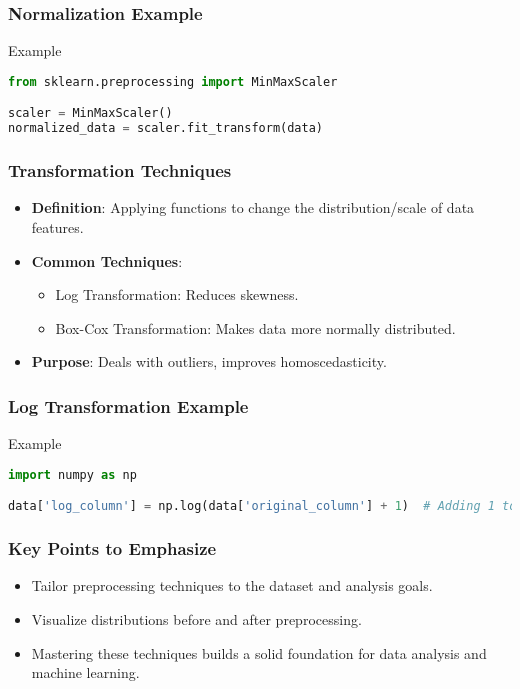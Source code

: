 \documentclass{beamer}
\begin{document}
\begin{frame}[fragile]
    \frametitle{Normalization Example}
    \begin{block}{Example}
    \begin{lstlisting}[language=Python]
from sklearn.preprocessing import MinMaxScaler

scaler = MinMaxScaler()
normalized_data = scaler.fit_transform(data)
    \end{lstlisting}
    \end{block}
\end{frame}

\begin{frame}
    \frametitle{Transformation Techniques}
    \begin{itemize}
        \item \textbf{Definition}: Applying functions to change the distribution/scale of data features.
        \item \textbf{Common Techniques}:
        \begin{itemize}
            \item Log Transformation: Reduces skewness.
            \item Box-Cox Transformation: Makes data more normally distributed.
        \end{itemize}
        \item \textbf{Purpose}: Deals with outliers, improves homoscedasticity.
    \end{itemize}
\end{frame}

\begin{frame}[fragile]
    \frametitle{Log Transformation Example}
    \begin{block}{Example}
    \begin{lstlisting}[language=Python]
import numpy as np

data['log_column'] = np.log(data['original_column'] + 1)  # Adding 1 to avoid log(0)
    \end{lstlisting}
    \end{block}
\end{frame}

\begin{frame}
    \frametitle{Key Points to Emphasize}
    \begin{itemize}
        \item Tailor preprocessing techniques to the dataset and analysis goals.
        \item Visualize distributions before and after preprocessing.
        \item Mastering these techniques builds a solid foundation for data analysis and machine learning.
    \end{itemize}
\end{frame}
\end{document}
